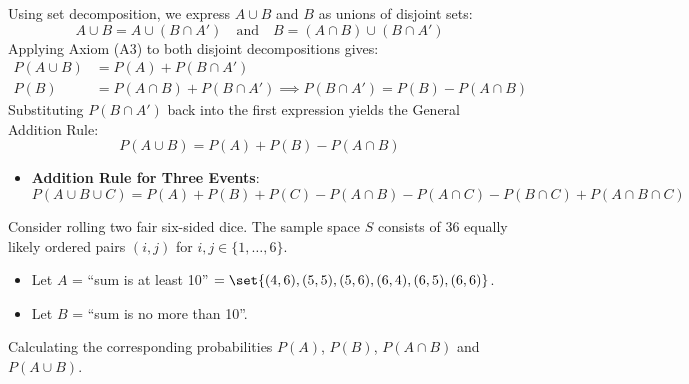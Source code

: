 \begin{proofbox}[(R3.1)]
    Using set decomposition, we express $A \cup B$ and $B$ as unions of disjoint sets:
    \[
        A \cup B = A \cup (B \cap A') \quad \text{and} \quad B = (A \cap B) \cup (B \cap A')
    \]
    Applying Axiom (A3) to both disjoint decompositions gives:
    \begin{align*}
        P(A \cup B) &= P(A) + P(B \cap A') \\
        P(B) &= P(A \cap B) + P(B \cap A') \implies P(B \cap A') = P(B) - P(A \cap B)
    \end{align*}
    Substituting $P(B \cap A')$ back into the first expression yields the General Addition Rule:
    \[
        P(A \cup B) = P(A) + P(B) - P(A \cap B)
    \]
\end{proofbox}
\begin{center}
    \label{fig:2.2}
\end{center}

\begin{itemize}
    \item[\textbf{(R3.2)}] \textbf{Addition Rule for Three Events}:
    \[
        P(A \cup B \cup C) = P(A) + P(B) + P(C) - P(A \cap B) - P(A \cap C) - P(B \cap C) + P(A \cap B \cap C)
    \]
\end{itemize}

\begin{exercise}
    Consider rolling two fair six-sided dice. The sample space $S$ consists of $36$ equally likely ordered pairs $(i, j)$ for $i, j \in \{1, \dots, 6\}$.
    \begin{itemize}\setlength\itemsep{1em}
        \item Let $A$ = \enquote{sum is at least 10} $= \set{(4,6), (5,5), (5,6), (6,4), (6,5), (6,6)}$.
        \item Let $B$ = \enquote{sum is no more than 10}.
    \end{itemize}

    Calculating the corresponding probabilities $P(A)$, $P(B)$, $P(A \cap B)$ and $P(A \cup B)$.
\end{exercise}

